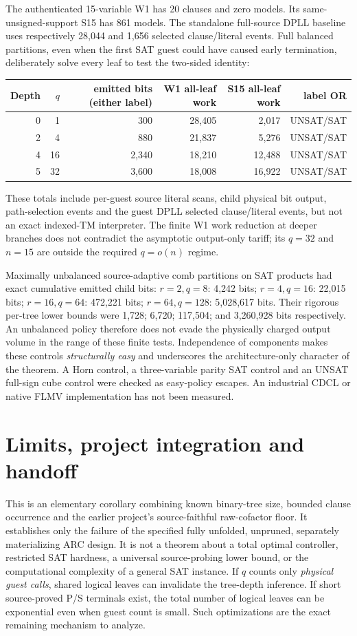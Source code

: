 \documentclass[11pt]{article}
\begin{document}
The authenticated 15-variable W1 has 20 clauses and zero models. Its same-unsigned-support S15 has 861 models. The standalone full-source DPLL baseline uses respectively 28,044 and 1,656 selected clause/literal events. Full balanced partitions, even when the first SAT guest could have caused early termination, deliberately solve every leaf to test the two-sided identity:
\begin{center}\small\begin{tabular}{rrrrrr}\toprule
Depth& $q$ & emitted bits (either label)&W1 all-leaf work&S15 all-leaf work&label OR\\\midrule
0&1&300&28,405&2,017&UNSAT/SAT\\
2&4&880&21,837&5,276&UNSAT/SAT\\
4&16&2,340&18,210&12,488&UNSAT/SAT\\
5&32&3,600&18,008&16,922&UNSAT/SAT\\\bottomrule\end{tabular}\end{center}
These totals include per-guest source literal scans, child physical bit output, path-selection events and the guest DPLL selected clause/literal events, but not an exact indexed-TM interpreter. The finite W1 work reduction at deeper branches does not contradict the asymptotic output-only tariff; its $q=32$ and $n=15$ are outside the required $q=o(n)$ regime.

Maximally unbalanced source-adaptive comb partitions on SAT products had exact cumulative emitted child bits: $r=2,q=8$: 4,242 bits; $r=4,q=16$: 22,015 bits; $r=16,q=64$: 472,221 bits; $r=64,q=128$: 5,028,617 bits. Their rigorous per-tree lower bounds were 1,728; 6,720; 117,504; and 3,260,928 bits respectively. An unbalanced policy therefore does not evade the physically charged output volume in the range of these finite tests. Independence of components makes these controls \emph{structurally easy} and underscores the architecture-only character of the theorem. A Horn control, a three-variable parity SAT control and an UNSAT full-sign cube control were checked as easy-policy escapes. An industrial CDCL or native FLMV implementation has not been measured.

\section*{Limits, project integration and handoff}
This is an elementary corollary combining known binary-tree size, bounded clause occurrence and the earlier project's source-faithful raw-cofactor floor. It establishes only the failure of the specified fully unfolded, unpruned, separately materializing ARC design. It is not a theorem about a total optimal controller, restricted SAT hardness, a universal source-probing lower bound, or the computational complexity of a general SAT instance. If $q$ counts only \emph{physical guest calls}, shared logical leaves can invalidate the tree-depth inference. If short source-proved P/S terminals exist, the total number of logical leaves can be exponential even when guest count is small. Such optimizations are the exact remaining mechanism to analyze.
\end{document}
